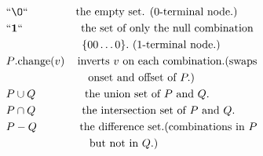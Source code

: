 \documentclass[letterpaper, 10 pt, conference]{ieeeconf}
\begin{document}
\begin{align*}
&``{\O}``           &\text{the empty set. (0-terminal node.) } \ \ \ \ \ \\
&``\textbf{1}``     &\text{the set of only the null combination	} \ \\
&                   &\{ 0 0 \ldots 0 \}.\ \text{(1-terminal node.)} \ \ \ \ \ \ \ \ \ \ \ \\
&P\text{.change}(v) &\text{inverts } v \text{ on each combination.(swaps} \ \\
&					&\text{onset and offset of } P.) \ \ \ \ \ \ \ \ \ \ \ \ \ \ \ \ \ \ \\
&P \cup Q			&\text{the union set of } P \text{ and } Q. \ \ \ \ \ \ \ \ \ \ \ \ \ \ \\
&P \cap Q			&\text{the intersection set of } P \text{ and } Q. \ \ \ \ \ \ \ \\
&P - Q				&\text{the difference set.(combinations in } P \ \\
&					&\text{but not in } Q.) \ \ \ \ \ \ \ \ \ \ \ \ \ \ \ \ \ \ \ \ \ \ \ \ \ \ \ \ 
\end{align*}
\end{document}
